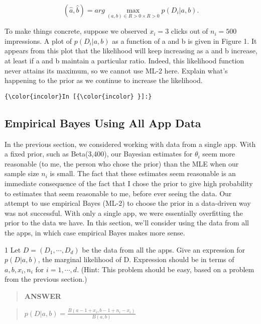 \documentclass[11pt]{article}
\begin{document}
\[(\hat a, \hat b) = arg\max\limits_{(a,b)∈R>0×R>0} p(D_i | a, b).\]

To make things concrete, suppose we observed \(x_i = 3\) clicks out of
\(n_i = 500\) impressions. A plot of \(p(D_i| a, b)\) as a function of a
and b is given in Figure 1. It appears from this plot that the
likelihood will keep increasing as a and b increase, at least if a and b
maintain a particular ratio. Indeed, this likelihood function never
attains its maximum, so we cannot use ML-2 here. Explain what's
happening to the prior as we continue to increase the likelihood.

    \begin{Verbatim}[commandchars=\\\{\}]
{\color{incolor}In [{\color{incolor} }]:} 
\end{Verbatim}

\clearpage

    \subsection{Empirical Bayes Using All App
Data}\label{empirical-bayes-using-all-app-data}

In the previous section, we considered working with data from a single
app. With a fixed prior, such as Beta(3,400), our Bayesian estimates for
\(\theta_i\) seem more reasonable (to me, the person who chose the
prior) than the MLE when our sample size \(n_i\) is small. The fact that
these estimates seem reasonable is an immediate consequence of the fact
that I chose the prior to give high probability to estimates that seem
reasonable to me, before ever seeing the data. Our attempt to use
empirical Bayes (ML-2) to choose the prior in a data-driven way was not
successful. With only a single app, we were essentially overfitting the
prior to the data we have. In this section, we'll consider using the
data from all the apps, in which case empirical Bayes makes more sense.

    1 Let \(D=(D_1, \cdots , D_d)\) be the data from all the apps. Give an
expression for \(p(D | a, b)\), the marginal likelihood of D. Expression
should be in terms of \(a, b, x_i, n_i\) for \(i = 1, \cdots, d\).
(Hint: This problem should be easy, based on a problem from the previous
section.)

    \begin{quote}
\textbf{ANSWER}
\end{quote}

\begin{quote}
\(p(D|a,b)=\frac{B(a-1+x_i, b-1+n_i-x_i)}{B(a,b)}\)
\end{quote}
\end{document}
